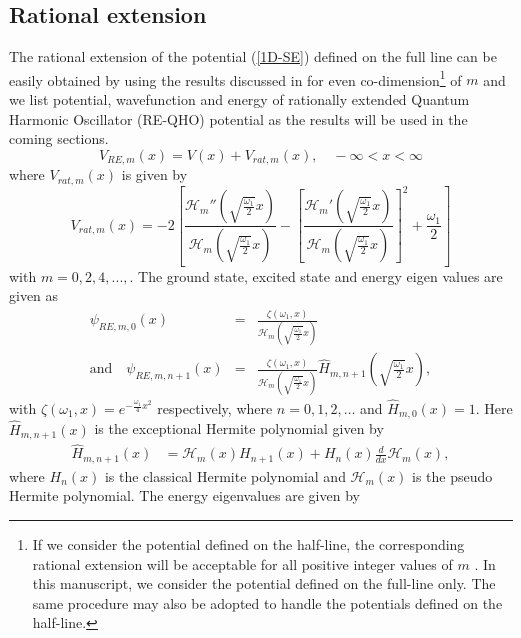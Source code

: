 \documentclass[a4paper, 12pt]{article}
\begin{document}
\subsection{Rational extension}
The rational extension of the potential (\ref{1D-SE}) defined on the full line can be easily obtained by using the results discussed in \cite{marquette2013two, Kumar:2024tsz} for even co-dimension\footnote{If we consider the potential defined on the half-line, the corresponding rational extension will be acceptable for all positive integer values of $m$ \cite{Kumar:2024tsz}. In this manuscript, we consider the potential defined on the full-line only. The same procedure may also be adopted to handle the potentials defined on the half-line.} of $m$  and we list potential, wavefunction and energy of rationally extended Quantum Harmonic Oscillator (RE-QHO) potential as the results will be used in the coming sections. 
\begin{equation}\label{1D-V-RE-x}
  V_{RE,m}(x) = V(x) + V_{rat,m}\left(x\right), \quad -\infty < x < \infty
\end{equation}
where $V_{rat,m}(x)$ is given by 
\begin{equation}\label{rat}
    V_{rat,m}(x)=-2\left[\frac{\mathcal{H}_m''\left(\sqrt{\frac{\omega_1}{2}} x\right)}{\mathcal{H}_m\left(\sqrt{\frac{\omega_1}{2}} x\right)} - \left[\frac{\mathcal{H}_m'\left(\sqrt{\frac{\omega_1}{2}} x\right)}{\mathcal{H}_m\left(\sqrt{\frac{\omega_1}{2}} x\right)}\right]^2 + \frac{\omega_1}{2}\right]
\end{equation}
with $m=0,2,4,...,$. The ground state, excited state and energy eigen values are given as 
\begin{eqnarray}\label{1D-psi-RE-x}
  \psi_{RE,m,0}(x) &=& \frac{\zeta\left(\omega_1,x\right)}{\mathcal{H}_m\left(\sqrt{\frac{\omega_1}{2}} x\right)}\nonumber\\
\mbox{and} \quad 
  \psi_{RE,m,n+1}(x) &=& \frac{\zeta\left(\omega_1,x\right)}{\mathcal{H}_m\left(\sqrt{\frac{\omega_1}{2}} x\right)}\hat{H}_{m,n+1}\left(\sqrt{\frac{\omega_1}{2}} x\right),
\end{eqnarray}
with  $\zeta(\omega_1,x)=e^{- \frac{\omega_1 }{4}x^2}$ respectively, where \( n = 0, 1, 2, \dots \) and \(\hat{H}_{m,0}(x) = 1\). Here $\hat{H}_{m,n+1}(x)$ is the exceptional Hermite polynomial \cite{marquette2013two} given by
\begin{align}
  \hat{H}_{m,n+1}(x) &= \mathcal{H}_m(x) H_{n+1}(x) + H_n(x) \frac{d}{dx} \mathcal{H}_m(x),
\end{align}
where \( H_n(x) \) is the classical Hermite polynomial and \( \mathcal{H}_m(x) \) is the pseudo Hermite polynomial. The energy eigenvalues \cite{Kumar:2024tsz} are given by
\end{document}
